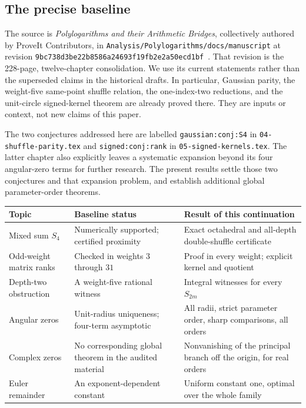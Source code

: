 \documentclass[11pt]{article}
\numberwithin{equation}{section}
\theoremstyle{plain}
\theoremstyle{definition}
\theoremstyle{remark}
\newcommand{\basecommit}{\nolinkurl{9bc738d3be22b8586a24693f19fb2e2a50ecd1bf}}
\begin{document}
\subsection{The precise baseline}

The source is \emph{Polylogarithms and their Arithmetic Bridges},
collectively authored by ProveIt Contributors, in
\nolinkurl{Analysis/Polylogarithms/docs/manuscript} at revision
\basecommit\ \cite{ProveIt}. That revision is the 228-page, twelve-chapter
consolidation. We use its current statements rather than the superseded
claims in the historical drafts. In particular, Gaussian parity,
the weight-five same-point shuffle relation, the one-index-two
reductions, and the unit-circle signed-kernel theorem are already
proved there. They are inputs or context, not new claims of this paper.

The two conjectures addressed here are labelled
\nolinkurl{gaussian:conj:S4} in \texttt{04-shuffle-parity.tex} and
\nolinkurl{signed:conj:rank} in \texttt{05-signed-kernels.tex}.
The latter chapter also explicitly leaves a systematic expansion beyond
its four angular-zero terms for further research. The present results
settle those two conjectures and that expansion problem, and establish
additional global parameter-order theorems.

\begin{center}
\small
\begin{tabular}{@{}>{\raggedright\arraybackslash}p{}>{\raggedright\arraybackslash}p{}>{\raggedright\arraybackslash}p{}@{}}
\toprule
Topic & Baseline status & Result of this continuation\\
\midrule
Mixed sum $S_4$ & Numerically supported; certified proximity & Exact
octahedral and all-depth double-shuffle certificate\\[3pt]
Odd-weight matrix ranks & Checked in weights $3$ through $31$ &
Proof in every weight; explicit kernel and quotient\\[3pt]
Depth-two obstruction & A weight-five rational witness &
Integral witnesses for every $S_{2m}$\\[3pt]
Angular zeros & Unit-radius uniqueness; four-term asymptotic &
All radii, strict parameter order, sharp comparisons, all orders\\[3pt]
Complex zeros & No corresponding global theorem in the audited material &
Nonvanishing of the principal branch off the origin, for real orders\\[3pt]
Euler remainder & An exponent-dependent constant &
Uniform constant one, optimal over the whole family\\
\bottomrule
\end{tabular}
\end{center}
\end{document}
